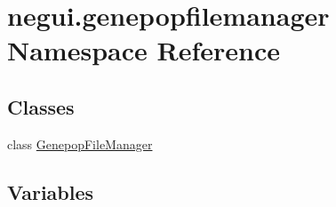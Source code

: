 \hypertarget{namespacenegui_1_1genepopfilemanager}{}\section{negui.\+genepopfilemanager Namespace Reference}
\label{namespacenegui_1_1genepopfilemanager}
\subsection*{Classes}
\begin{DoxyCompactItemize}
\item 
class \hyperlink{classnegui_1_1genepopfilemanager_1_1GenepopFileManager}{Genepop\+File\+Manager}
\end{DoxyCompactItemize}
\subsection*{Variables}
